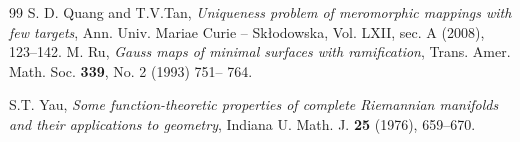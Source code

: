 \documentclass[12pt,article]{amsart}
\newcommand{\E}{{\mathbb{E}}}
\numberwithin{equation}{section}
\begin{document}
\begin{thebibliography}{99}
% 
% 
% 
% 
 S. D. Quang and T.V.Tan, \textit{Uniqueness problem of meromorphic mappings with few targets}, Ann. Univ. Mariae Curie – Skłodowska, Vol. LXII, sec. A (2008), 123--142.
% 
% 
% 
% 
 M. Ru, \textit{Gauss maps of minimal surfaces with ramification}, Trans. Amer. Math. Soc. \textbf{339}, No. 2 (1993) 751--
764.

 S.T. Yau, \textit{Some function-theoretic properties of complete Riemannian manifolds and their applications to geometry}, Indiana U. Math. J. \textbf{25} (1976), 659--670.
\end{thebibliography}
\end{document}
